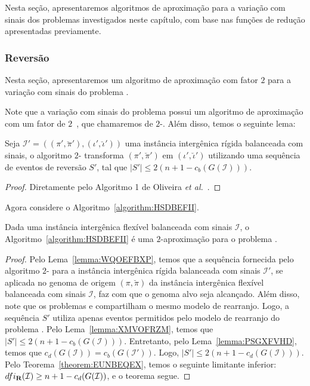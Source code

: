 Nesta seção, apresentaremos algoritmos de aproximação para a variação com sinais dos problemas investigados neste capítulo, com base nas funções de redução apresentadas previamente.

\subsubsection{Reversão}

Nesta seção, apresentaremos um algoritmo de aproximação com fator $2$ para a variação com sinais do problema \SbFIR{}. 

Note que a variação com sinais do problema \SbIR{} possui um algoritmo de aproximação com um fator de $2$~\cite{2021a-oliveira-etal}, que chamaremos de $2$-\SbIR{}. Além disso, temos o seguinte lema:

\begin{lemma}\label{lemma:XMVOFRZM}
Seja $\mathcal{I}' = ((\pi',\breve\pi'),(\iota',\breve\iota'))$ uma instância intergênica rígida balanceada com sinais, o algoritmo $2$-\SbIR{} transforma $(\pi',\breve\pi')$ em $(\iota',\breve\iota')$ utilizando uma sequência de eventos de reversão $S'$, tal que $|S'| \le 2({n+1} - c_b(G(\mathcal{I})))$.
\end{lemma}
\begin{proof}
Diretamente pelo Algoritmo 1 de Oliveira \textit{et al.}~\cite{2021b-oliveira-etal}.
\end{proof}

Agora considere o Algoritmo~\ref{algorithm:HSDBEFII}.



\begin{theorem}\label{theorem:GTWKCOJR}
Dada uma instância intergênica flexível balanceada com sinais $\mathcal{I}$, o Algoritmo~\ref{algorithm:HSDBEFII} é uma $2$-aproximação para o problema \SbFIR{}.
\end{theorem}
\begin{proof}
Pelo Lema~\ref{lemma:WQOEFBXP}, temos que a sequência fornecida pelo algoritmo $2$-\SbIR{} para a instância intergênica rígida balanceada com sinais $\mathcal{I'}$, se aplicada no genoma de origem $(\pi,\breve\pi)$ da instância intergênica flexível balanceada com sinais $\mathcal{I}$, faz com que o genoma alvo seja alcançado. Além disso, note que os problemas \SbIR{} e \SbFIR{} compartilham o mesmo modelo de rearranjo. Logo, a sequência $S'$ utiliza apenas eventos permitidos pelo modelo de rearranjo do problema \SbFIR{}. Pelo Lema~\ref{lemma:XMVOFRZM}, temos que $|S'| \le 2({n+1} - c_b(G(\mathcal{I})))$. Entretanto, pelo Lema~\ref{lemma:PSGXFVHD}, temos que $c_d(G(\mathcal{I})) = c_b(G(\mathcal{I}'))$. Logo, $|S'| \le 2({n+1} - c_d(G(\mathcal{I})))$. Pelo Teorema~\ref{theorem:EUNBEQEX}, temos o seguinte limitante inferior: $dfi_{\textbf{R}}(\mathcal{I}) \ge {n+1} - c_d(G(\mathcal{I}))$, e o teorema segue.
\end{proof}

